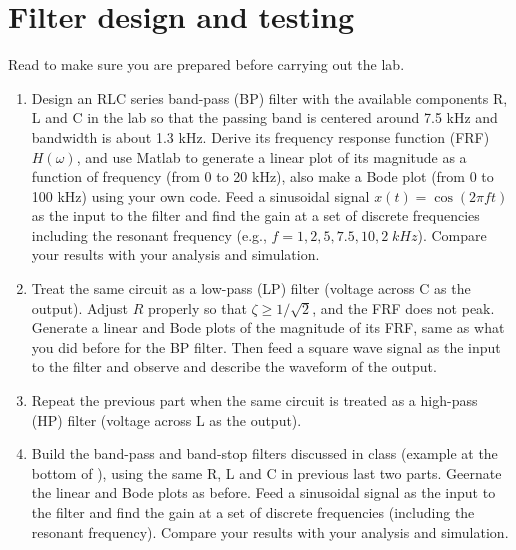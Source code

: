 
\usepackage{html}



\section*{Filter design and testing}

Read 
to make sure you are prepared before carrying out the lab.

\begin{enumerate}

\item Design an RLC series band-pass (BP) filter with the available components R, L and 
  C in the lab so that the passing band is centered around 7.5 kHz and bandwidth is about 
  1.3 kHz. Derive its frequency response function (FRF) $H(\omega)$, and use Matlab to 
  generate a linear plot of its magnitude as a function of frequency (from 0 to 20 kHz), 
  also make a Bode plot (from 0 to 100 kHz) using your own code. Feed a sinusoidal signal 
  $x(t)=\cos(2\pi ft)$ as the input to the filter and find the gain at a set of discrete
  frequencies including the resonant frequency (e.g., $f=1, 2, 5, 7.5, 10, 2\; kHz$). 
  Compare your results with your analysis and simulation.

\item Treat the same circuit as a low-pass (LP) filter (voltage across C as the output).
  Adjust $R$ properly so that $\zeta\ge 1/\sqrt{2}$, and the FRF does not peak. 
  Generate a linear and Bode plots of the magnitude of its FRF, same as what you did 
  before for the BP filter. Then feed a square wave signal as the input to the filter 
  and observe and describe the waveform of the output.

\item Repeat the previous part when the same circuit is treated as a high-pass (HP) 
  filter (voltage across L as the output).

\item Build the band-pass and band-stop filters discussed in class 
  (example at the bottom of ),
  using the same R, L and C in previous last two parts. Geernate the linear and Bode plots 
  as before. Feed a sinusoidal signal as the input to the filter and find the gain at a
  set of discrete frequencies (including the resonant frequency). Compare your results 
  with your analysis and simulation.

\end{enumerate}

  
